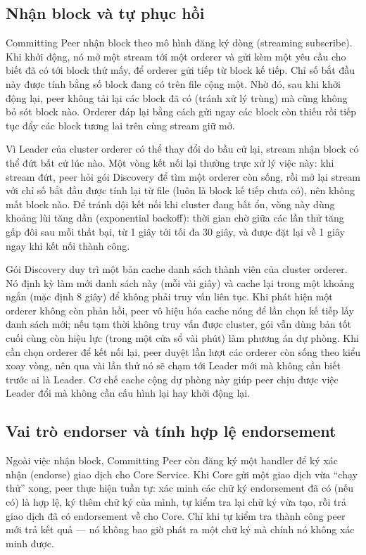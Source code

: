 \subsection{Nhận block và tự phục hồi}
\label{sec:cp-deliver}

Committing Peer nhận block theo mô hình đăng ký dòng (streaming subscribe).
Khi khởi động, nó mở một stream tới một orderer và gửi kèm một yêu cầu cho
biết đã có tới block thứ mấy, để orderer gửi tiếp từ block kế tiếp. Chỉ số
bắt đầu này được tính bằng số block đang có trên file cộng một. Nhờ đó, sau
khi khởi động lại, peer không tải lại các block đã có (tránh xử lý trùng) mà
cũng không bỏ sót block nào. Orderer đáp lại bằng cách gửi ngay các block còn
thiếu rồi tiếp tục đẩy các block tương lai trên cùng stream giữ mở.

Vì Leader của cluster orderer có thể thay đổi do bầu cử lại, stream nhận
block có thể đứt bất cứ lúc nào. Một vòng kết nối lại thường trực xử lý việc
này: khi stream đứt, peer hỏi gói Discovery để tìm một orderer còn sống, rồi
mở lại stream với chỉ số bắt đầu được tính lại từ file (luôn là block kế
tiếp chưa có), nên không mất block nào. Để tránh dội kết nối khi cluster đang
bất ổn, vòng này dùng khoảng lùi tăng dần (exponential backoff): thời gian
chờ giữa các lần thử tăng gấp đôi sau mỗi thất bại, từ 1 giây tới tối đa 30
giây, và được đặt lại về 1 giây ngay khi kết nối thành công.

Gói Discovery duy trì một bản cache danh sách thành viên của cluster orderer.
Nó định kỳ làm mới danh sách này (mỗi vài giây) và cache lại trong một
khoảng ngắn (mặc định 8 giây) để không phải truy vấn liên tục. Khi phát hiện
một orderer không còn phản hồi, peer vô hiệu hóa cache nóng để lần chọn kế
tiếp lấy danh sách mới; nếu tạm thời không truy vấn được cluster, gói vẫn
dùng bản tốt cuối cùng còn hiệu lực (trong một cửa sổ vài phút) làm phương án
dự phòng. Khi cần chọn orderer để kết nối lại, peer duyệt lần lượt các
orderer còn sống theo kiểu xoay vòng, nên qua vài lần thử nó sẽ chạm tới
Leader mới mà không cần biết trước ai là Leader. Cơ chế cache cộng dự phòng
này giúp peer chịu được việc Leader đổi mà không cần cấu hình lại hay khởi
động lại.

\subsection{Vai trò endorser và tính hợp lệ endorsement}
\label{sec:cp-endorse}

Ngoài việc nhận block, Committing Peer còn đăng ký một handler để ký xác
nhận (endorse) giao dịch cho Core Service. Khi Core gửi một giao dịch vừa
``chạy thử'' xong, peer thực hiện tuần tự: xác minh các chữ ký endorsement đã
có (nếu có) là hợp lệ, ký thêm chữ ký của mình, tự kiểm tra lại chữ ký vừa
tạo, rồi trả giao dịch đã có endorsement về cho Core. Chỉ khi tự kiểm tra
thành công peer mới trả kết quả --- nó không bao giờ phát ra một chữ ký mà
chính nó không xác minh được.


